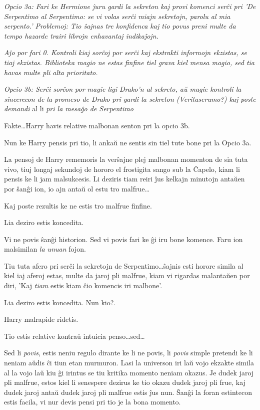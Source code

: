\emph{Opcio 3a: Fari ke Hermione ĵuru gardi la sekreton kaj provi komenci
serĉi pri 'De Serpentimo al Serpentimo: se vi volas serĉi miajn
sekretojn, parolu al mia serpento.' Problemoj: Tio ŝajnas tre
konfidenca kaj tio povus preni multe da tempo hazarde trairi librojn
enhavantaj indikaĵojn.}

\emph{Aĵo por fari 0. Kontroli kiaj sorĉoj por serĉi kaj ekstrakti
  informojn ekzistas, se tiaj ekzistas. Biblioteka magio ne estas
  finfine tiel grava kiel mensa magio, sed tia havas multe pli alta
  prioritato.}

\emph{Opcio 3b: Serĉi sorĉon por magie ligi Drako'n al sekreto, aŭ
  magie kontroli la sincerecon de la promeso de Drako pri gardi la
  sekreton (Veritaserumo?) kaj poste demandi} al li \emph{pri la
  mesaĝo de Serpentimo}

Fakte\ldots Harry havis relative malbonan senton pri la opcio 3b.

Nun ke Harry pensis pri tio, li ankaŭ ne sentis sin tiel tute bone pri
la Opcio 3a.

La pensoj de Harry rememoris la verŝajne plej malbonan momenton de sia
tuta vivo, tiuj longaj sekundoj de hororo el frostigita sango sub la
Ĉapelo, kiam li pensis ke li jam malsukcesis. Li deziris tiam reiri
ĵus kelkajn minutojn antaŭen por ŝanĝi ion, io ajn antaŭ ol estu tro
malfrue\ldots

Kaj poste rezultis ke ne estis tro malfrue finfine.

Lia deziro estis koncedita.

Vi ne povis ŝanĝi historion. Sed vi povis fari ke ĝi iru bone
komence. Faru ion malsimilan \emph{la unuan} fojon.

Tiu tuta afero pri serĉi la sekretojn de Serpentimo\ldots ŝajnis esti
horore simila al kiel iaj aferoj estas, multe da jaroj pli malfrue,
kiam vi rigardas malantaŭen por diri, 'Kaj \emph{tiam} estis kiam ĉio
komencis iri malbone'.

Lia deziro estis koncedita. Nun kio?.

Harry malrapide ridetis.

Tio estis relative kontraŭ intuicia penso\ldots sed\ldots

Sed li \emph{povis}, estis neniu regulo dirante ke li ne povis, li
\emph{povis} simple pretendi ke li neniam aŭdis ĉi tiun etan
murmuron. Lasi la universon iri laŭ vojo ekzakte simila al la vojo laŭ
kiu ĝi irintus se tiu kritika momento neniam okazus. Je dudek jaroj
pli malfrue, estos kiel li senespere dezirus ke tio okazu dudek jaroj
pli frue, kaj dudek jaroj antaŭ dudek jaroj pli malfrue estis ĵus
nun. Ŝanĝi la foran estintecon estis facila, vi nur devis pensi pri
tio je la bona momento.

